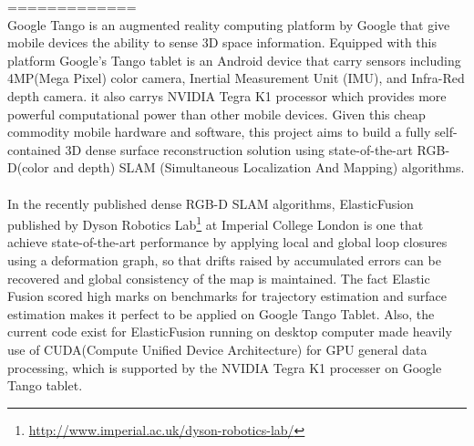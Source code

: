 \documentclass[12pt,twoside]{article}
\begin{document}
=============\\                                                                                                                                                                                                                                                                                                                                                                                                                                                                                                                                                                                                                                                                                                                                                                                                                                                                                                                                                                                                                         Google Tango\cite{tango} is an augmented reality computing platform by Google that give mobile devices the ability to sense 3D space information. Equipped with this platform Google's Tango tablet is an Android device that carry sensors including 4MP(Mega Pixel) color camera, Inertial Measurement Unit (IMU), and Infra-Red depth camera. it also carrys NVIDIA Tegra K1 processor which provides more powerful computational power than other mobile devices. Given this cheap commodity mobile hardware and software, this project aims to build a fully self-contained 3D dense surface reconstruction solution using  state-of-the-art RGB-D(color and depth) SLAM (Simultaneous Localization And Mapping) algorithms.\\
\\
In the recently published dense RGB-D SLAM algorithms, ElasticFusion\cite{whelan2016elasticfusion} published by Dyson Robotics Lab\footnote{\url{http://www.imperial.ac.uk/dyson-robotics-lab/}} at Imperial College London is one that achieve state-of-the-art performance by applying local and global loop closures using a deformation graph, so that drifts raised by accumulated errors can be recovered and global consistency of the map is maintained. The fact Elastic Fusion scored high marks on benchmarks for trajectory estimation and surface estimation makes it perfect to be applied on Google Tango Tablet. Also, the current code exist for ElasticFusion running on desktop computer made heavily use of CUDA(Compute Unified Device Architecture) for GPU general data processing, which is supported by the NVIDIA Tegra K1 processer on Google Tango tablet.\\
\end{document}
